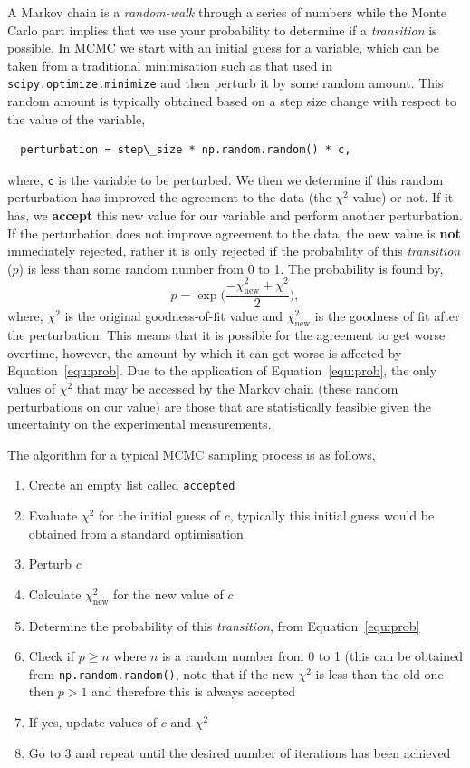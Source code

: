 \documentclass[a4paper]{article}
\begin{document}
A Markov chain is a \emph{random-walk} through a series of numbers while the Monte Carlo part implies that we use your probability to determine if a \emph{transition} is possible.
In MCMC we start with an initial guess for a variable, which can be taken from a traditional minimisation such as that used in \texttt{scipy.optimize.minimize} and then perturb it by some random amount. 
This random amount is typically obtained based on a step size change with respect to the value of the variable, 
%
\begin{lstlisting}
  perturbation = step\_size * np.random.random() * c,
\end{lstlisting}
%
where, \texttt{c} is the variable to be perturbed.
We then we determine if this random perturbation has improved the agreement to the data (the $\chi^2$-value) or not. 
If it has, we \textbf{accept} this new value for our variable and perform another perturbation. 
If the perturbation does not improve agreement to the data, the new value is \textbf{not} immediately rejected, rather it is only rejected if the probability of this \emph{transition} ($p$) is less than some random number from 0 to 1. 
The probability is found by, 
%
\begin{equation}
  p = \exp{\bigg(\frac{-\chi^2_{\text{new}} + \chi^2}{2}\bigg)},
  \label{equ:prob}
\end{equation}
%
where, $\chi^2$ is the original goodness-of-fit value and $\chi^2_{\text{new}}$ is the goodness of fit after the perturbation. 
This means that it is possible for the agreement to get worse overtime, however, the amount by which it can get worse is affected by Equation~\ref{equ:prob}. 
Due to the application of Equation~\ref{equ:prob}, the only values of $\chi^2$ that may be accessed by the Markov chain (these random perturbations on our value) are those that are statistically feasible given the uncertainty on the experimental measurements. 

The algorithm for a typical MCMC sampling process is as follows, 
\begin{enumerate}
  \item {Create an empty list called \texttt{accepted}}
  \item {Evaluate $\chi^2$ for the initial guess of $c$, typically this initial guess would be obtained from a standard optimisation}
  \item {Perturb $c$}
  \item {Calculate $\chi^2_{\text{new}}$ for the new value of $c$}
  \item {Determine the probability of this \emph{transition}, from Equation~\ref{equ:prob}}
  \item {Check if $p \ge n$ where $n$ is a random number from 0 to 1 (this can be obtained from \texttt{np.random.random()}, note that if the new $\chi^2$ is less than the old one then $p > 1$ and therefore this is always accepted}
  \item {If yes, update values of $c$ and $\chi^2$}
  \item {Go to 3 and repeat until the desired number of iterations has been achieved}
\end{enumerate}
\end{document}
